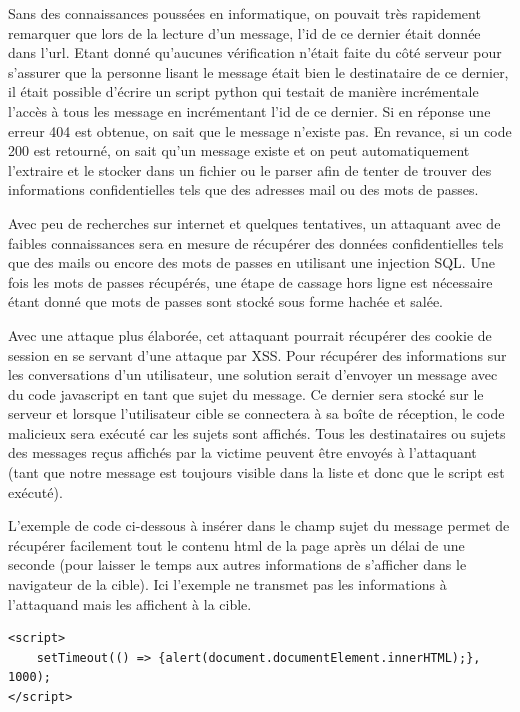 \documentclass[12pt]{article}
\begin{document}
Sans des connaissances poussées en informatique, on pouvait très rapidement remarquer que lors de la lecture d'un message, l'id de ce dernier était donnée dans l'url. Etant donné qu'aucunes vérification n'était faite du côté serveur pour s'assurer que la personne lisant le message était bien le destinataire de ce dernier, il était possible d'écrire un script python qui testait de manière incrémentale l'accès à tous les message en incrémentant l'id de ce dernier. Si en réponse une erreur 404 est obtenue, on sait que le message n'existe pas. En revance, si un code 200 est retourné, on sait qu'un message existe et on peut automatiquement l'extraire et le stocker dans un fichier ou le parser afin de tenter de trouver des informations confidentielles tels que des adresses mail ou des mots de passes.

Avec peu de recherches sur internet et quelques tentatives, un attaquant avec de faibles connaissances sera en mesure de récupérer des données confidentielles tels que des mails ou encore des mots de passes en utilisant une injection SQL. Une fois les mots de passes récupérés, une étape de cassage hors ligne est nécessaire étant donné que mots de passes sont stocké sous forme hachée et salée.

Avec une attaque plus élaborée, cet attaquant pourrait récupérer des cookie de session en se servant d'une attaque par XSS. Pour récupérer des informations sur les conversations d'un utilisateur, une solution serait d'envoyer un message avec du code javascript en tant que sujet du message. Ce dernier sera stocké sur le serveur et lorsque l'utilisateur cible se connectera à sa boîte de réception, le code malicieux sera exécuté car les sujets sont affichés. Tous les destinataires ou sujets des messages reçus affichés par la victime peuvent être envoyés à l'attaquant (tant que notre message est toujours visible dans la liste et donc que le script est exécuté).

L'exemple de code ci-dessous à insérer dans le champ sujet du message permet de récupérer facilement tout le contenu html de la page après un délai de une seconde (pour laisser le temps aux autres informations de s'afficher dans le navigateur de la cible). Ici l'exemple ne transmet pas les informations à l'attaquand mais les affichent à la cible. 

\begin{lstlisting}[style=JAVA]
<script>
	setTimeout(() => {alert(document.documentElement.innerHTML);}, 1000);
</script>
\end{lstlisting}
\end{document}
